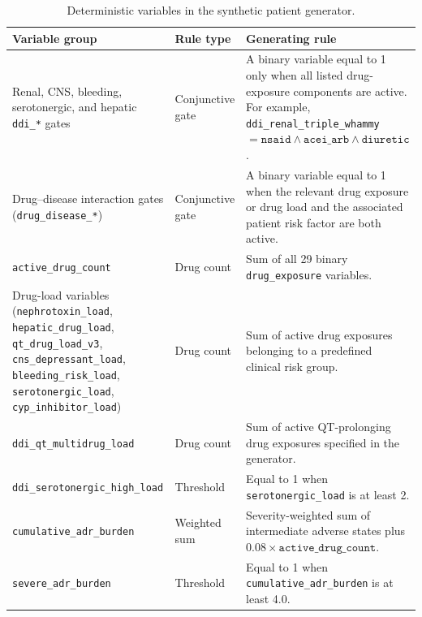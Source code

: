\begin{table}[htbp]
    \centering
    \small
    \caption{Deterministic variables in the synthetic patient generator.}
    \label{tab:deterministic_variables}
    \begin{tabularx}{\textwidth}{@{}
        p{}
        p{}
        X@{}}
        \toprule
        \textbf{Variable group} &
        \textbf{Rule type} &
        \textbf{Generating rule} \\
        \midrule

        Renal, CNS, bleeding, serotonergic, and hepatic
        \texttt{ddi\_*} gates &
        Conjunctive gate &
        A binary variable equal to 1 only when all listed drug-exposure
        components are active. For example,
        \texttt{ddi\_renal\_triple\_whammy}
        $= \texttt{nsaid} \land \texttt{acei\_arb} \land
        \texttt{diuretic}$. \\

        \addlinespace
        Drug--disease interaction gates
        (\texttt{drug\_disease\_*}) &
        Conjunctive gate &
        A binary variable equal to 1 when the relevant drug exposure or drug
        load and the associated patient risk factor are both active. \\

        \addlinespace
        \texttt{active\_drug\_count} &
        Drug count &
        Sum of all 29 binary \texttt{drug\_exposure} variables. \\

        \addlinespace
        Drug-load variables
        (\texttt{nephrotoxin\_load}, \texttt{hepatic\_drug\_load},
        \texttt{qt\_drug\_load\_v3}, \texttt{cns\_depressant\_load},
        \texttt{bleeding\_risk\_load}, \texttt{serotonergic\_load},
        \texttt{cyp\_inhibitor\_load}) &
        Drug count &
        Sum of active drug exposures belonging to a predefined clinical risk
        group. \\

        \addlinespace
        \texttt{ddi\_qt\_multidrug\_load} &
        Drug count &
        Sum of active QT-prolonging drug exposures specified in the
        generator. \\

        \addlinespace
        \texttt{ddi\_serotonergic\_high\_load} &
        Threshold &
        Equal to 1 when \texttt{serotonergic\_load} is at least 2. \\

        \addlinespace
        \texttt{cumulative\_adr\_burden} &
        Weighted sum &
        Severity-weighted sum of intermediate adverse states plus
        $0.08 \times \texttt{active\_drug\_count}$. \\

        \addlinespace
        \texttt{severe\_adr\_burden} &
        Threshold &
        Equal to 1 when \texttt{cumulative\_adr\_burden} is at least 4.0. \\

        \bottomrule
    \end{tabularx}
\end{table}

